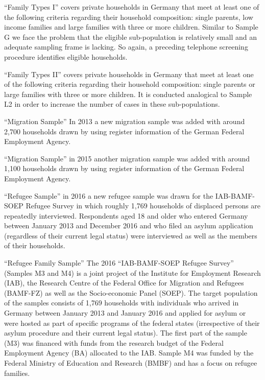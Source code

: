 \documentclass[letterpaper,10pt,openany,onesideH,english]{sphinxmanual}
\begin{document}
 “Family Types I” covers private households in Germany that meet at least one of the following criteria regarding their household composition: single parents, low income families and large families with three or more children. Similar to Sample G we face the problem that the eligible sub-population is relatively small and an adequate sampling frame is lacking. So again, a preceding telephone screening procedure identifies eligible households.

 “Family Types II” covers private households in Germany that meet at least one of the following criteria regarding their household composition: single parents or large families with three or more children. It is conducted analogical to Sample L2 in order to increase the number of cases in these sub-populations.

 “Migration Sample” In 2013 a new migration sample was added with around 2,700 households drawn by using register information of the German Federal Employment Agency.

 “Migration Sample” in 2015 another migration sample was added with around 1,100 households drawn by using register information of the German Federal Employment Agency.

 “Refugee Sample” in 2016 a new refugee sample was drawn for the IAB-BAMF-SOEP Refugee Survey in which roughly 1,769 households of displaced persons are repeatedly interviewed. Respondents aged 18 and older who entered Germany between January 2013 and December 2016 and who filed an asylum application (regardless of their current legal status) were interviewed as well as the members of their households.

 “Refugee Family Sample” The 2016 “IAB-BAMF-SOEP Refugee Survey” (Samples M3 and M4) is a joint project of the Institute for Employment Research (IAB), the Research Centre of the Federal Office for Migration and Refugees (BAMF-FZ) as well as the Socio-economic Panel (SOEP). The target population of the samples consists of 1,769 households with individuals who arrived in Germany between January 2013 and January 2016 and applied for asylum or were hosted as part of specific programs of the federal states (irrespective of their asylum procedure and their current legal status). The first part of the sample (M3) was financed with funds from the research budget of the Federal Employment Agency (BA) allocated to the IAB. Sample M4 was funded by the Federal Ministry of Education and Research (BMBF) and has a focus on refugee families.
\end{document}
